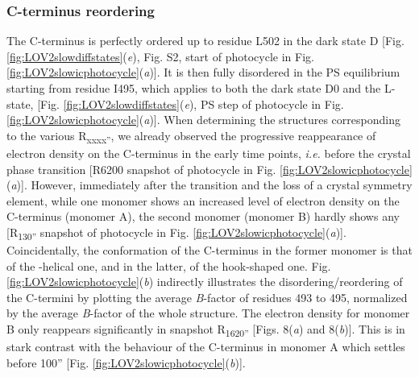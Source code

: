 \subsubsection{C-terminus reordering}
The C-terminus is perfectly ordered up to residue L502 in the dark state D [Fig. \ref{fig:LOV2slowdiffstates}(\textit{e}), Fig. S2, start of photocycle in Fig. \ref{fig:LOV2slowicphotocycle}(\textit{a})]. It is then fully disordered in the PS equilibrium starting from residue I495, which applies to both the dark state D0 and the L-state, [Fig. \ref{fig:LOV2slowdiffstates}(\textit{e}), PS step of photocycle in Fig. \ref{fig:LOV2slowicphotocycle}(\textit{a})]. When determining the structures corresponding to the various R\textsubscript{xxxx''}, we already observed the progressive reappearance of electron density on the C-terminus in the early time points, \textit{i.e.} before the crystal phase transition [R6200 snapshot of photocycle in Fig. \ref{fig:LOV2slowicphotocycle}(\textit{a})]. However, immediately after the transition and the loss of a crystal symmetry element, while one monomer shows an increased level of electron density on the C-terminus (monomer A), the second monomer (monomer B) hardly shows any [R\textsubscript{130''} snapshot of photocycle in Fig. \ref{fig:LOV2slowicphotocycle}(\textit{a})]. Coincidentally, the conformation of the C-terminus in the former monomer is that of the \textalpha-helical one, and in the latter, of the hook-shaped one. Fig. \ref{fig:LOV2slowicphotocycle}(\textit{b}) indirectly illustrates the disordering/reordering of the C-termini by plotting the average \textit{B}-factor of residues 493 to 495, normalized by the average \textit{B}-factor of the whole structure. The electron density for monomer B only reappears significantly in snapshot R\textsubscript{1620''} [Figs. 8(\textit{a}) and 8(\textit{b})]. This is in stark contrast with the behaviour of the C-terminus in monomer A which settles before 100'' [Fig. \ref{fig:LOV2slowicphotocycle}(\textit{b})].
